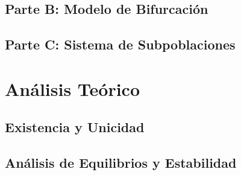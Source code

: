 \documentclass[a4paper,10pt,twocolumn]{article}
\begin{document}
\subsection{Parte B: Modelo de Bifurcación}\label{subsec:parte-b}



\subsection{Parte C: Sistema de Subpoblaciones}\label{subsec:parte-c}



\section{Análisis Teórico}\label{sec:teoria}


\subsection{Existencia y Unicidad}\label{subsec:existencia}



\subsection{Análisis de Equilibrios y Estabilidad}\label{subsec:equilibrios}
\end{document}
